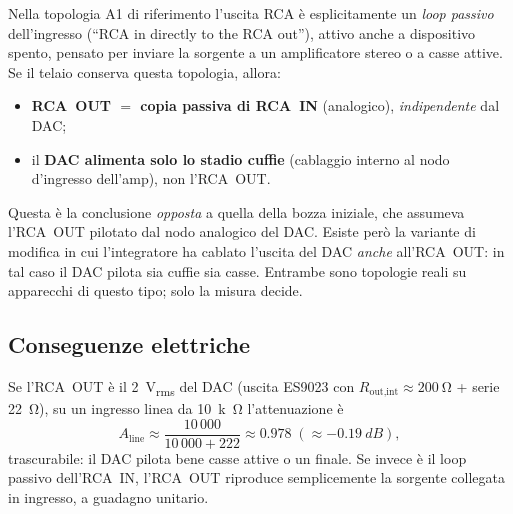 Nella topologia A1 di riferimento l'uscita RCA è esplicitamente un
\emph{loop passivo} dell'ingresso (``RCA in directly to the RCA out''),
attivo anche a dispositivo spento, pensato per inviare la sorgente a un
amplificatore stereo o a casse attive. Se il telaio conserva questa
topologia, allora:
\begin{itemize}
  \item \textbf{RCA~OUT $=$ copia passiva di RCA~IN} (analogico), \emph{indipendente} dal DAC;
  \item il \textbf{DAC alimenta solo lo stadio cuffie} (cablaggio interno
        al nodo d'ingresso dell'amp), non l'RCA~OUT.
\end{itemize}
Questa è la conclusione \emph{opposta} a quella della bozza iniziale, che
assumeva l'RCA~OUT pilotato dal nodo analogico del DAC. Esiste però la
variante di modifica in cui l'integratore ha cablato l'uscita del DAC
\emph{anche} all'RCA~OUT: in tal caso il DAC pilota sia cuffie sia casse.
Entrambe sono topologie reali su apparecchi di questo tipo; solo la
misura decide.

\subsection{Conseguenze elettriche}
Se l'RCA~OUT è il \SI{2}{V_{rms}} del DAC (uscita ES9023 con
$R_{\text{out,int}}\approx\SI{200}{\ohm}$ + serie \SI{22}{\ohm}), su un
ingresso linea da \SI{10}{k\ohm} l'attenuazione è
\begin{equation}
  A_{\text{line}}\approx\frac{10\,000}{10\,000+222}\approx0.978\;(\approx\SI{-0.19}{dB}),
\end{equation}
trascurabile: il DAC pilota bene casse attive o un finale. Se invece è il
loop passivo dell'RCA~IN, l'RCA~OUT riproduce semplicemente la sorgente
collegata in ingresso, a guadagno unitario.

